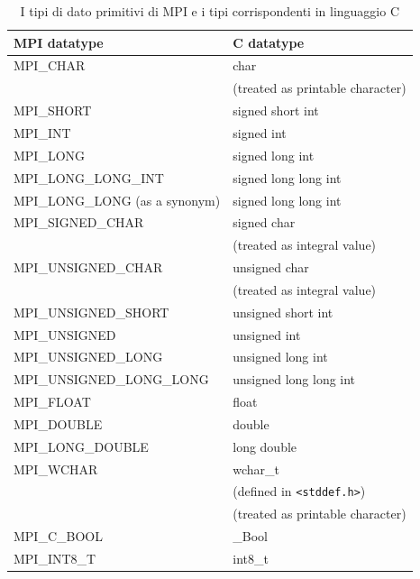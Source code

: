 \begin{table}[H]
\centering
\caption{I tipi di dato primitivi di MPI e i tipi corrispondenti in linguaggio C}
\begin{tabular}{ll}
\toprule
MPI datatype & C datatype \\
\midrule
MPI\_CHAR                              & char \\
                                       & (treated as printable character) \\[4pt]
MPI\_SHORT                             & signed short int \\
MPI\_INT                               & signed int \\
MPI\_LONG                              & signed long int \\
MPI\_LONG\_LONG\_INT                   & signed long long int \\
MPI\_LONG\_LONG (as a synonym)         & signed long long int \\
MPI\_SIGNED\_CHAR                      & signed char \\
                                       & (treated as integral value) \\[4pt]
MPI\_UNSIGNED\_CHAR                    & unsigned char \\
                                       & (treated as integral value) \\[4pt]
MPI\_UNSIGNED\_SHORT                   & unsigned short int \\
MPI\_UNSIGNED                          & unsigned int \\
MPI\_UNSIGNED\_LONG                    & unsigned long int \\
MPI\_UNSIGNED\_LONG\_LONG              & unsigned long long int \\
MPI\_FLOAT                             & float \\
MPI\_DOUBLE                            & double \\
MPI\_LONG\_DOUBLE                      & long double \\
MPI\_WCHAR                             & wchar\_t \\
                                       & (defined in \texttt{<stddef.h>}) \\
                                       & (treated as printable character) \\[4pt]
MPI\_C\_BOOL                           & \_Bool \\
MPI\_INT8\_T                           & int8\_t \\

\end{tabular}
\end{table}
